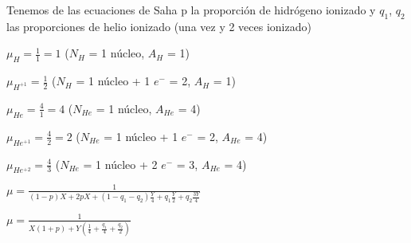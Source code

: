 \documentclass[10pt]{book}
\begin{document}
\begin{description}
\item Tenemos de las ecuaciones  de Saha p la proporción de hidrógeno ionizado y  $q_1$, $q_2$ las proporciones de helio ionizado (una vez y 2 veces ionizado)

$ \mu_H  = \frac{1}{1} = 1$ ($N_H$ = 1 núcleo, $A_H$ = 1)

$ \mu_{H^{+1}}  = \frac{1}{2} $ ($N_H$ = 1 núcleo + 1 $e^-$ = 2, $A_H$ = 1)

$ \mu_{He}  = \frac{4}{1} = 4$ ($N_{He}$ = 1 núcleo, $A_{He}$ = 4)

$ \mu_{He^{+1}}  = \frac{4}{2} = 2$ ($N_{He}$ = 1 núcleo + 1 $e^-$ = 2, $A_{He}$ = 4)

$ \mu_{He^{+2}}  = \frac{4}{3} $ ($N_{He}$ = 1 núcleo + 2 $e^-$ = 3, $A_{He}$ = 4)
 
$ \mu = \frac{1}{(1-p)X + 2pX + (1-q_1-q_2)  \frac{Y}{4} + q_1 \frac{Y}{2} + q_2 \frac{3Y}{4}}$

$ \mu = \frac{1}{X(1 + p) + Y (\frac{1}{4}  + \frac{q_1}{4} + \frac{q_2}{2})}$

\end{description}
\end{document}
